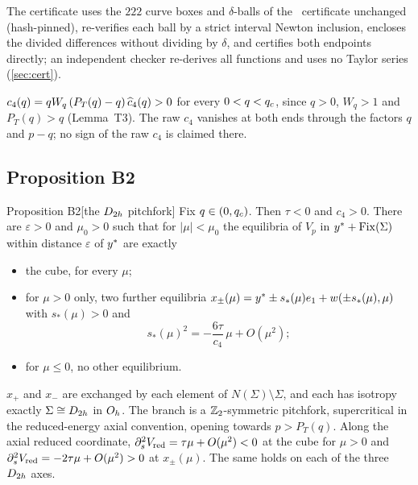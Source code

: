 The certificate uses the $222$ curve boxes and $\delta$-balls of the \lemK\ certificate unchanged (hash-pinned), re-verifies
each ball by a strict interval Newton inclusion, encloses the divided differences without dividing by $\delta$, and
certifies both endpoints directly; an independent checker re-derives all functions and uses no Taylor series
(\cref{sec:cert}).

\begin{corollary}[sign of $c_4$]\label{cor:c4}
$c_4(q)=qW_q\,(P_T(q)-q)\,\widehat{c}_4(q)>0$ for every $0<q<q_{c}$, since $q>0$, $W_q>1$ and $P_T(q)>q$ (Lemma~T3). The raw $c_4$
vanishes at both ends through the factors $q$ and $p-q$; no sign of the raw $c_4$ is claimed there.
\end{corollary}

\subsection{Proposition B2}

\begin{named}{Proposition B2}[the $D_{2h}$ pitchfork]\label{prop:B2}
Fix $q\in(0,q_{c})$. Then $\tau<0$ and $c_4>0$. There are $\varepsilon>0$ and $\mu_0>0$ such that for $|\mu|<\mu_0$ the
equilibria of $V_p$ in $y^{*}+\operatorname{Fix}(\Sigma)$ within distance $\varepsilon$ of $y^{*}$ are exactly
\begin{itemize}
\item the cube, for every $\mu$;
\item for $\mu>0$ only, two further equilibria $x_\pm(\mu)=y^{*}\pm s_*(\mu)e_1+w(\pm s_*(\mu),\mu)$ with $s_*(\mu)>0$ and
\begin{equation}\label{eq:ampD2h}
s_*(\mu)^2=-\frac{6\tau}{c_4}\,\mu+O(\mu^2);
\end{equation}
\item for $\mu\le0$, no other equilibrium.
\end{itemize}
$x_+$ and $x_-$ are exchanged by each element of $N(\Sigma)\setminus\Sigma$, and each has isotropy exactly $\Sigma\cong D_{2h}$ in
$O_{h}$. The branch is a $\mathbb{Z}_2$-symmetric pitchfork, supercritical in the reduced-energy axial convention, opening towards
$p>P_T(q)$. Along the axial reduced coordinate, $\partial_s^2V_{\mathrm{red}}=\tau\mu+O(\mu^2)<0$ at the cube for $\mu>0$ and
$\partial_s^2V_{\mathrm{red}}=-2\tau\mu+O(\mu^2)>0$ at $x_\pm(\mu)$. The same holds on each of the three $D_{2h}$ axes.
\end{named}

